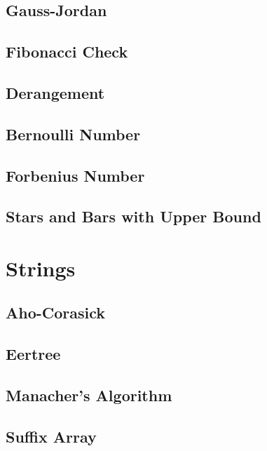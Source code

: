 \subsection{Gauss-Jordan}

\subsection{Fibonacci Check}

\subsection{Derangement}

\subsection{Bernoulli Number}

\subsection{Forbenius Number}

\subsection{Stars and Bars with Upper Bound}

\section{Strings}
\subsection{Aho-Corasick}

\subsection{Eertree}

\subsection{Manacher's Algorithm}

\subsection{Suffix Array}

